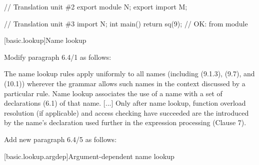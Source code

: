 \begin{std.txt}
\begin{codeblock}
    // Translation unit \#2
    export module N;
    export import M;

    // Translation unit \#3
    import N;
    int main() { return sq(9); }       // OK:  from module 
    \end{codeblock}
    \added{
    \exitexample
   \exitnote}
\end{std.txt}


\setcounter{section}{3}
[basic.lookup]{Name lookup}

Modify paragraph 6.4/1 as follows:
\begin{std.txt}
  \pnum[1]
  The name lookup rules apply uniformly to all names
  (including  (9.1.3),
   (9.7), and 
   (10.1))
  wherever the grammar allows such names in the context discussed by a 
  particular rule.
  Name lookup associates the use of a name with a set of declarations (6.1)
  of that name.
  [...] Only after name lookup, function overload resolution (if applicable)
  and access checking have succeeded are the
   introduced by
  the name's declaration
  used further in the expression processing (Clause 7).
\end{std.txt}

\begin{before}
Add new paragraph 6.4/5 as follows:
\begin{std.txt}\color{addclr}
  \pnum[5]
\end{std.txt}
\end{before}

\setcounter{subsection}{1}
[basic.lookup.argdep]{Argument-dependent name lookup}

